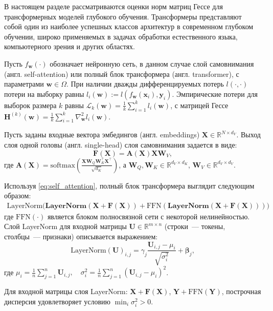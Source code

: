В настоящем разделе рассматриваются оценки норм матриц Гессе для трансформерных моделей глубокого обучения. Трансформеры представляют собой один из наиболее успешных классов архитектур в современном глубоком обучении, широко применяемых в задачах обработки естественного языка, компьютерного зрения и других областях.

Пусть $f_{\mathbf{w}}(\cdot)$ обозначает нейронную сеть, в данном случае слой самовнимания (англ. self-attention) или полный блок трансформера (англ. transformer), с параметрами $\mathbf{w} \in \Omega$.
При наличии дважды дифференцируемых потерь $l(\cdot, \cdot)$ потери на выборку равны $l_i(\mathbf{w}) := l(f_{\mathbf{w}}(\mathbf{x}_i), \mathbf{y}_i)$.
Эмпирические потери для выборок размера $k$ равны $\mathcal{L}_k(\mathbf{w}) = \frac{1}{k} \sum_{i=1}^k l_i(\mathbf{w})$, с матрицей Гессе $\mathbf{H}^{(k)}(\mathbf{w}) = \frac{1}{k} \sum_{i=1}^k \nabla^2_{\mathbf{w}} l_i(\mathbf{w})$.

Пусть заданы входные вектора эмбедингов (англ. embeddings) $\mathbf{X} \in \mathbb{R}^{N \times d_V}$.
Выход слоя одной головы (англ. single-head) слоя самовнимания задается в виде: 
\begin{equation} \label{eq:self_attention}
    \mathbf{F}(\mathbf{X}) = \mathbf{A}(\mathbf{X}) \mathbf{X} \mathbf{W}_V,
\end{equation}
где $\mathbf{A}(\mathbf{X}) = \mathrm{softmax}\left( \frac{\mathbf{X} \mathbf{W}_Q \mathbf{W}_K^\top \mathbf{X}^\top}{\sqrt{d_K}} \right)$, а $\mathbf{W}_Q, \mathbf{W}_K \in \mathbb{R}^{d_V \times d_K}$, $\mathbf{W}_V \in \mathbb{R}^{d_V \times d_V}$.

Используя \eqref{eq:self_attention}, полный блок трансформера выглядит следующим образом:
\begin{align}
    \text{LayerNorm}\Big(\mathbf{\text{LayerNorm}(\mathbf{X} + \mathbf{F}(\mathbf{X}))} + \mathrm{FFN}(\mathbf{\text{LayerNorm}(\mathbf{X} + \mathbf{F}(\mathbf{X}))})\Big)
\end{align}
где $\mathrm{FFN}(\cdot)$ является блоком полносвязной сети с некоторой нелинейностью.
Слой LayerNorm для входной матрицы $\mathbf{U} \in \mathbb{R}^{m \times n}$ (строки~--- токены, столбцы~--- признаки) описывается выражением:
\[
    \text{LayerNorm}(\mathbf{U})_{i,j} = \gamma_j \frac{\mathbf{U}_{i,j} - \mu_i}{\sqrt{\sigma_i^2}} + \mathbf{\beta}_j,
\]
где $\mu_i = \frac{1}{n} \sum_{j=1}^n \mathbf{U}_{i,j}, \quad \sigma_i^2 = \frac{1}{n} \sum_{j=1}^n (\mathbf{U}_{i,j} - \mu_i)^2$.

\begin{assumption}\label{assumption:LayerNorm}
Для входной матрицы слоя LayerNorm: $\mathbf{X} + \mathbf{F}(\mathbf{X})$, $\mathbf{Y} + \mathrm{FFN}(\mathbf{Y})$, построчная дисперсия удовлетворяет условию $\min_i \sigma_i^2 > 0$.
\end{assumption}

